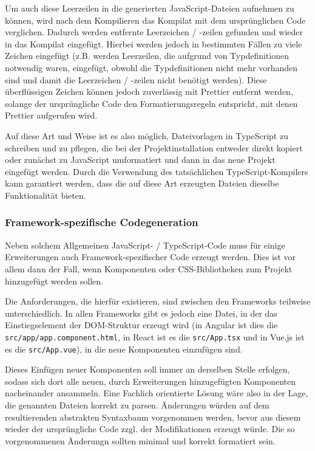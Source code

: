 Um auch diese Leerzeilen in die generierten JavaScript-Dateien aufnehmen zu können, wird nach dem Kompilieren das Kompilat mit dem ursprünglichen Code verglichen. Dadurch werden entfernte Leerzeichen / -zeilen gefunden und wieder in das Kompilat eingefügt. Hierbei werden jedoch in bestimmten Fällen zu viele Zeichen eingefügt (z.B. werden Leerzeilen, die aufgrund von Typdefinitionen notwendig waren, eingefügt, obwohl die Typdefinitionen nicht mehr vorhanden sind und damit die Leerzeichen / -zeilen nicht benötigt werden). Diese überflüssigen Zeichen können jedoch zuverlässig mit Prettier entfernt werden, solange der ursprüngliche Code den Formatierungsregeln entspricht, mit denen Prettier aufgerufen wird.

Auf diese Art und Weise ist es also möglich, Dateivorlagen in TypeScript zu schreiben und zu pflegen, die bei der Projektinstallation entweder direkt kopiert oder zunächst zu JavaScript umformatiert und dann in das neue Projekt eingefügt werden. Durch die Verwendung des tatsächlichen TypeScript-Kompilers kann garantiert werden, dass die auf diese Art erzeugten Dateien dieselbe Funktionalität bieten.

\subsubsection{Framework-spezifische Codegeneration}
Neben solchem Allgemeinen JavaScript- / TypeScript-Code muss für einige Erweiterungen auch Framework-spezifischer Code erzeugt werden. Dies ist vor allem dann der Fall, wenn Komponenten oder CSS-Bibliotheken zum Projekt hinzugefügt werden sollen.

Die Anforderungen, die hierfür existieren, sind zwischen den Frameworks teilweise unterschiedlich. In allen Frameworks gibt es jedoch eine Datei, in der das Einstiegselement der \gls{DOM}-Struktur erzeugt wird (in Angular ist dies die \verb|src/app/app.component.html|, in React ist es die \verb|src/App.tsx| und in Vue.js ist es die \verb|src/App.vue|), in die neue Komponenten einzufügen sind.

Dieses Einfügen neuer Komponenten soll immer an derselben Stelle erfolgen, sodass sich dort alle neuen, durch Erweiterungen hinzugefügten Komponenten nacheinander ansammeln. Eine Fachlich orientierte Lösung wäre also in der Lage, die genannten Dateien korrekt zu parsen. Änderungen würden auf dem resultierenden abstrakten Syntaxbaum vorgenommen werden, bevor aus diesem wieder der ursprüngliche Code zzgl. der Modifikationen erzeugt würde. Die so vorgenommenen Änderungn sollten minimal und korrekt formatiert sein.

